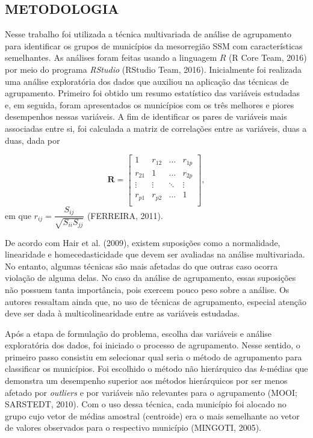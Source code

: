 \documentclass[10pt,twoside]{article}
\begin{document}
\medskip

\subsection{METODOLOGIA}\label{ME}

Nesse trabalho foi utilizada a técnica multivariada de análise de agrupamento para identificar os grupos de municípios da mesorregião SSM com características semelhantes. As análises foram feitas usando a linguagem $R$ (R Core Team, 2016) por meio do programa \textit{RStudio} (RStudio Team, 2016). Inicialmente foi realizada uma análise exploratória dos dados que auxiliou na aplicação das técnicas de agrupamento. Primeiro foi obtido um resumo estatístico das variáveis estudadas e, em seguida, foram apresentados os municípios com os três melhores e piores desempenhos nessas variáveis. A fim de identificar os pares de variáveis mais associadas entre si, foi calculada a matriz de correlações entre as variáveis, duas a duas, dada por

\begin{equation}\label{R}
        \boldsymbol{R} =
        \left[
        \begin{array}{cccc}
        1      & r_{12} & \dots & r_{1p} \\
        r_{21} & 1      & \dots & r_{2p} \\
        \vdots & \vdots & \ddots & \vdots \\
        r_{p1} & r_{p2} & \dots & 1 \\
        \end{array}
        \right],
\end{equation}
em que $r_{ij} = \dfrac{S_{ij}}{\sqrt{S_{ii}S_{jj}}}$ (FERREIRA, 2011).

De acordo com Hair et al. (2009), existem suposições como a normalidade, linearidade e homecedasticidade que devem ser avaliadas na análise multivariada. No entanto, algumas técnicas são mais afetadas do que outras caso ocorra violação de alguma delas. No caso da análise de agrupamento, essas suposições não possuem tanta importância, pois exercem pouco peso sobre a análise. Os autores ressaltam ainda que, no uso de técnicas de agrupamento, especial atenção deve ser dada à multicolinearidade entre as variáveis estudadas. 

Após a etapa de formulação do problema, escolha das variáveis e análise exploratória dos dados, foi iniciado o processo de agrupamento. Nesse sentido, o primeiro passo consistiu em selecionar qual seria o método de agrupamento para classificar os municípios. Foi escolhido o método não hierárquico das $k$-médias que demonstra um desempenho superior aos métodos hierárquicos por ser menos afetado por \textit{outliers} e por variáveis não relevantes para o agrupamento (MOOI; SARSTEDT, 2010). Com o uso dessa técnica, cada município foi alocado no grupo cujo vetor de médias amostral (centroide) era o mais semelhante ao vetor de valores observados para o respectivo município (MINGOTI, 2005).
\end{document}
